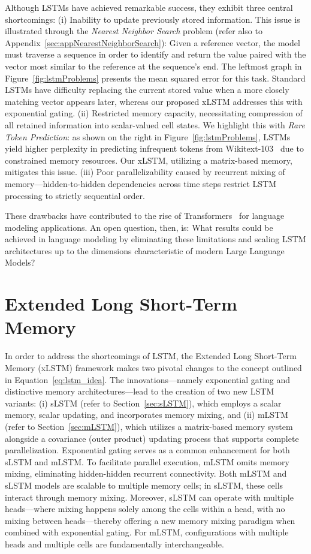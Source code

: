 Although LSTMs have achieved remarkable success, they exhibit three central shortcomings: (i) Inability to update previously stored information. This issue is illustrated through the {\it Nearest Neighbor Search} problem (refer also to Appendix~\ref{sec:appNearestNeighborSearch}): Given a reference vector, the model must traverse a sequence in order to identify and return the value paired with the vector most similar to the reference at the sequence’s end. The leftmost graph in Figure~\ref{fig:lstmProblems} presents the mean squared error for this task. Standard LSTMs have difficulty replacing the current stored value when a more closely matching vector appears later, whereas our proposed xLSTM addresses this with exponential gating. (ii) Restricted memory capacity, necessitating compression of all retained information into scalar-valued cell states. We highlight this with {\it Rare Token Prediction}: as shown on the right in Figure~\ref{fig:lstmProblems}, LSTMs yield higher perplexity in predicting infrequent tokens from Wikitext-103~\citep{Merity:17} due to constrained memory resources. Our xLSTM, utilizing a matrix-based memory, mitigates this issue. (iii) Poor parallelizability caused by recurrent mixing of memory—hidden-to-hidden dependencies across time steps restrict LSTM processing to strictly sequential order.

These drawbacks have contributed to the rise of Transformers~\citep{Vaswani:17} for language modeling applications. An open question, then, is: What results could be achieved in language modeling by eliminating these limitations and scaling LSTM architectures up to the dimensions characteristic of modern Large Language Models?

\section{Extended Long Short-Term Memory}
\label{sec:xLSTM}

In order to address the shortcomings of LSTM, the Extended Long Short-Term Memory (xLSTM) framework makes two pivotal changes to the concept outlined in Equation~\eqref{eq:lstm_idea}. The innovations—namely exponential gating and distinctive memory architectures—lead to the creation of two new LSTM variants: (i) sLSTM (refer to Section~\ref{sec:sLSTM}), which employs a scalar memory, scalar updating, and incorporates memory mixing, and (ii) mLSTM (refer to Section~\ref{sec:mLSTM}), which utilizes a matrix-based memory system alongside a covariance (outer product) updating process that supports complete parallelization. Exponential gating serves as a common enhancement for both sLSTM and mLSTM. To facilitate parallel execution, mLSTM omits memory mixing, eliminating hidden-hidden recurrent connectivity. Both mLSTM and sLSTM models are scalable to multiple memory cells; in sLSTM, these cells interact through memory mixing. Moreover, sLSTM can operate with multiple heads—where mixing happens solely among the cells within a head, with no mixing between heads—thereby offering a new memory mixing paradigm when combined with exponential gating. For mLSTM, configurations with multiple heads and multiple cells are fundamentally interchangeable.

